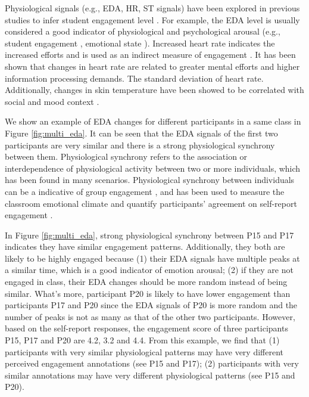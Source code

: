 \documentclass[sigconf]{acmart}
\begin{document}


Physiological signals (e.g., EDA, HR, ST signals) have been explored in previous studies to infer student engagement level \cite{gao2020n,di2018engagement}. For example, the EDA level is usually considered  a good indicator of physiological and psychological arousal (e.g., student engagement \cite{gao2020n}, emotional state \cite{di2018engagement}). Increased heart rate indicates the increased efforts and is used as an indirect measure of engagement \cite{richardson2020engagement}. It has been shown that changes in heart rate are related to greater mental efforts and higher information processing demands. The standard deviation of heart rate. Additionally, changes in skin temperature have been showed to be correlated with social and mood context \cite{ioannou2014thermal}. 

We show an example of EDA changes for different participants in a same class in Figure \ref{fig:multi_eda}. It can be seen that the EDA signals of the first two participants are very similar and there is a strong physiological synchrony  \cite{palumbo2017interpersonal} between them. Physiological synchrony refers to the association or interdependence of physiological activity between two or more individuals, which has been found in many scenarios. Physiological synchrony between individuals can be a indicative of group engagement \cite{palumbo2017interpersonal}, and has been used to measure the classroom emotional climate \cite{gashi2018using} and quantify participants' agreement on self-report engagement \cite{gashi2019using}. 

In  Figure \ref{fig:multi_eda}, strong physiological synchrony between P15 and P17 indicates they have similar engagement patterns. Additionally, they both are likely to be highly engaged because (1) their EDA signals have multiple peaks at a similar time, which is a good indicator of emotion arousal; (2) if they are not engaged in class, their EDA changes should be more random instead of being similar. What's more, participant P20 is likely to have lower engagement than participants P17 and P20 since the EDA signals of P20 is more random and the number of peaks is not as many as that of the other two participants. However, based on the self-report responses, the engagement score of three participants P15, P17 and P20 are 4.2, 3.2 and 4.4. From this example, we find that (1) participants with very similar physiological patterns may have very different perceived engagement annotations (see P15 and P17); (2) participants with very similar annotations may have very different physiological patterns (see P15 and P20).
\end{document}
